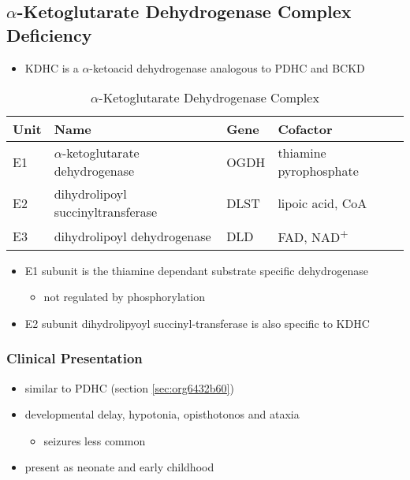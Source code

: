 \documentclass[12pt]{scrartcl}
\begin{document}
\subsection{\(\alpha\)-Ketoglutarate Dehydrogenase Complex Deficiency}
\label{sec:org92cfedf}
\begin{itemize}
\item KDHC is a \(\alpha\)-ketoacid dehydrogenase analogous to PDHC and BCKD
\end{itemize}


\begin{table}[htbp]
\caption{\label{tab:orge58f7b7}\(\alpha\)-Ketoglutarate Dehydrogenase Complex}
\centering
\begin{tabular}{llll}
Unit & Name & Gene & Cofactor\\
\hline
E1 & \(\alpha\)-ketoglutarate dehydrogenase & OGDH & thiamine pyrophosphate\\
E2 & dihydrolipoyl succinyltransferase & DLST & lipoic acid, CoA\\
E3 & dihydrolipoyl dehydrogenase & DLD & FAD, NAD\textsuperscript{+}\\
\end{tabular}
\end{table}

\begin{itemize}
\item E1 subunit is the thiamine dependant substrate specific dehydrogenase
\begin{itemize}
\item not regulated by phosphorylation
\end{itemize}
\item E2 subunit dihydrolipyoyl succinyl-transferase is also specific to KDHC
\end{itemize}

\subsubsection{Clinical Presentation}
\label{sec:org9aeb491}
\begin{itemize}
\item similar to PDHC (section \ref{sec:org6432b60})
\item developmental delay, hypotonia, opisthotonos and ataxia
\begin{itemize}
\item seizures less common
\end{itemize}
\item present as neonate and early childhood
\end{itemize}
\end{document}
